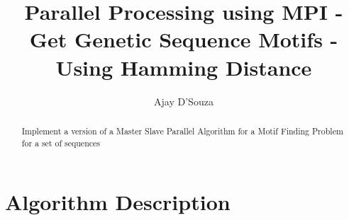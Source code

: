 \documentclass[twoside,11pt]{article}\usepackage{amsmath,amsfonts,amsthm,fullpage}
\title{Parallel Processing using MPI - Get Genetic Sequence Motifs - Using Hamming Distance}
\author{Ajay D'Souza }
\date{}
\begin{document}
\maketitle



\begin{abstract}
Implement a version of a Master Slave Parallel Algorithm for a Motif Finding Problem for a set of sequences
\end{abstract}

\pagebreak
\tableofcontents

\pagebreak
\listoffigures


\pagebreak

%
%
\section{Algorithm Description}
\label{algorithm}
\end{document}
